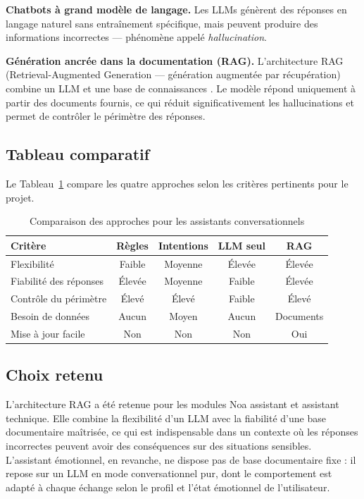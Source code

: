 \textbf{Chatbots à grand modèle de langage.}
Les LLMs génèrent des réponses en langage naturel sans entraînement spécifique, mais peuvent produire des informations incorrectes — phénomène appelé \textit{hallucination}.

\textbf{Génération ancrée dans la documentation (RAG).}
L'architecture RAG (Retrieval-Augmented Generation — génération augmentée
par récupération) combine un LLM et une base de connaissances \cite{lewis2020rag}.
Le modèle répond uniquement à partir des documents fournis,
ce qui réduit significativement les hallucinations
et permet de contrôler le périmètre des réponses.

\subsection{Tableau comparatif}

Le Tableau~\ref{tab:comparatif_chatbots} compare les quatre approches
selon les critères pertinents pour le projet.

\vspace{6pt}
\begin{table}[H]
\centering
\caption{Comparaison des approches pour les assistants conversationnels}
\label{tab:comparatif_chatbots}
\begin{tabular}{|l|c|c|c|c|}
\hline
\textbf{Critère} & \textbf{Règles} & \textbf{Intentions} & \textbf{LLM seul} & \textbf{RAG} \\
\hline
Flexibilité & Faible & Moyenne & Élevée & Élevée \\
Fiabilité des réponses & Élevée & Moyenne & Faible & Élevée \\
Contrôle du périmètre & Élevé & Élevé & Faible & Élevé \\
Besoin de données & Aucun & Moyen & Aucun & Documents \\
Mise à jour facile & Non & Non & Non & Oui \\
\hline
\end{tabular}
\end{table}

\subsection{Choix retenu}

L'architecture RAG a été retenue pour les modules Noa assistant et assistant technique.
Elle combine la flexibilité d'un LLM avec la fiabilité d'une base documentaire maîtrisée,
ce qui est indispensable dans un contexte où les réponses incorrectes
peuvent avoir des conséquences sur des situations sensibles.
L'assistant émotionnel, en revanche, ne dispose pas de base documentaire fixe :
il repose sur un LLM en mode conversationnel pur, dont le comportement
est adapté à chaque échange selon le profil et l'état émotionnel de l'utilisateur.

